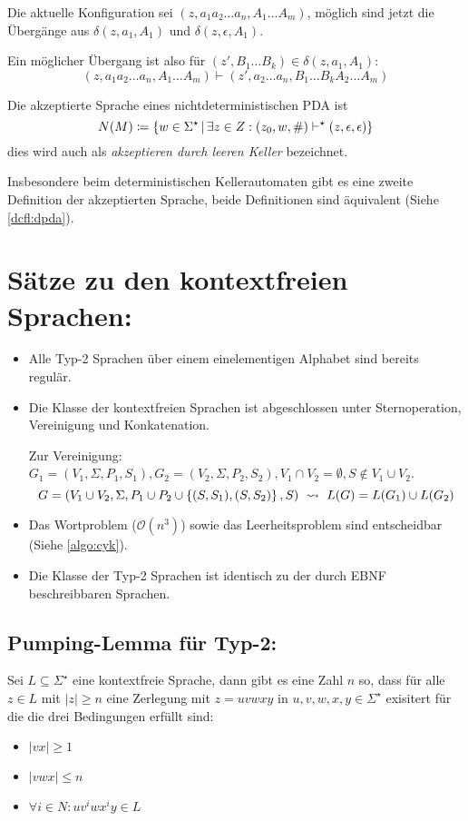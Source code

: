 Die aktuelle Konfiguration sei $(z,a_1a_2\ldots a_n,A_1\ldots A_m)$, möglich sind jetzt die Übergänge aus $\delta(z,a_1,A_1)$ und $\delta(z,\epsilon,A_1)$.

Ein möglicher Übergang ist also für $(z',B_1\ldots B_k)\in\delta(z,a_1,A_1)$:
\begin{equation*}
	(z,a_1a_2\ldots a_n,A_1\ldots A_m)\vdash (z',a_2\ldots a_n,B_1\ldots B_kA_2\ldots A_m)
\end{equation*}

Die akzeptierte Sprache eines nichtdeterministischen PDA ist
\begin{equation*}
	N(M)\coloneqq\left\{ w\in \Sigma^\star \,\middle|\, \exists z\in Z: (z_0, w, \#)\vdash^\star (z,\epsilon,\epsilon) \right\}
\end{equation*}
dies wird auch als \emph{akzeptieren durch leeren Keller} bezeichnet.

Insbesondere beim deterministischen Kellerautomaten gibt es eine zweite Definition der akzeptierten Sprache, beide Definitionen sind äquivalent (Siehe \autoref{dcfl:dpda}).


\section{Sätze zu den kontextfreien Sprachen:}
\begin{itemize}
	\item Alle Typ-2 Sprachen über einem einelementigen Alphabet sind bereits regulär.
	\item Die Klasse der kontextfreien Sprachen ist abgeschlossen unter Sternoperation, Vereinigung und Konkatenation.

	Zur Vereinigung: $G_1=(V_1,\Sigma, P_1,S_1), G_2=(V_2,\Sigma, P_2,S_2), V_1\cap V_2=\emptyset, S\not\in V_1\cup V_2$.
	\begin{equation*}
		G=(V_1\cup V_2, \Sigma, P_1\cup P_2\cup\simpleset{(S,S_1),(S,S_2)},S) \ \rightsquigarrow\  L(G)=L(G_1)\cup L(G_2)
	\end{equation*}
	\item Das Wortproblem ($\mathcal O(n^3)$) sowie das Leerheitsproblem sind entscheidbar (Siehe \autoref{algo:cyk}).
	\item Die Klasse der Typ-2 Sprachen ist identisch zu der durch EBNF beschreibbaren Sprachen.
\end{itemize}
\subsection{Pumping-Lemma für Typ-2:}
Sei $L\subseteq \Sigma^\star$ eine kontextfreie Sprache, dann gibt es eine Zahl $n$ so, dass für alle $z\in L$ mit $|z|\geq n$ eine Zerlegung mit $z=uvwxy$ in $u,v,w,x,y\in\Sigma^\star$ exisitert für die die drei Bedingungen erfüllt sind:
\begin{itemize}
	\item $|vx|\geq 1$
	\item $|vwx|\leq n$
	\item $\forall i\in N: uv^iwx^iy\in L$
\end{itemize}


